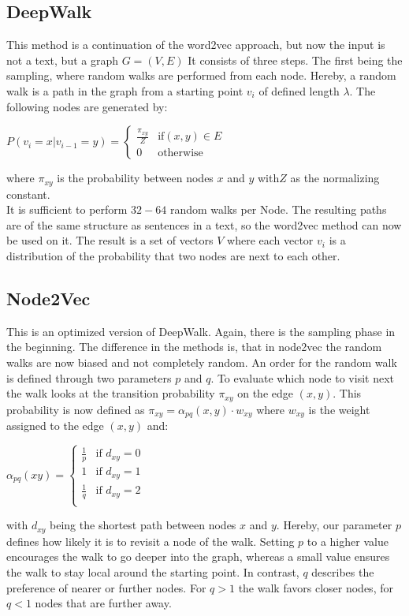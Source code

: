 \documentclass[sigconf]{acmart}
\begin{document}
\subsection{DeepWalk}
This method is a continuation of the word2vec approach, but now the input is not a text, but a graph \(G = (V,E)\)
It consists of three steps. The first being the sampling, where random walks are performed from each node.
Hereby, a random walk is a path in the graph from a starting point \(v_i\) of defined length \(\lambda\). 
The following nodes are generated by: 
\begin{center}
  \(P(v_i = x|v_{i-1} = y) = \begin{cases} \frac{\pi_{xy}}{Z} &\text{if} (x,y) \in E \\ 0 & \text{otherwise} \end{cases}\)
\end{center} 
where \(\pi_{xy}\) is the probability between nodes \(x\) and \(y\) with\(Z\) as the normalizing constant.\\
It is sufficient to perform \(32-64\) random walks per Node. The resulting paths are of the same structure as sentences in a text, so 
the word2vec method can now be used on it.
The result is a set of vectors \(V\) where each vector \(v_i\) is a distribution of the probability that two nodes are next to each other.
\cite{Godec.31.12.2018}


\subsection{Node2Vec}
This is an optimized version of DeepWalk.
Again, there is the sampling phase in the beginning. The difference in the methods is, that in node2vec the random walks are now biased and not completely random.
An order for the random walk is defined through two parameters \(p\) and \(q\). To evaluate which node to visit next the walk looks at the transition probability
\(\pi_{xy}\) on the edge \((x,y)\). This probability is now defined as \(\pi_{xy} = \alpha_{pq}(x, y) \cdot w_{xy}\) where \(w_{xy}\) is the weight assigned to the edge \((x,y)\) and:
\begin{center}
 \(\alpha_{pq}(xy) = \begin{cases} \frac{1}{p} & \text{if } d_{xy} = 0 \\ 1 & \text{if } d_{xy} = 1 \\\frac{1}{q} & \text{if } d_{xy} = 2 \\\end{cases}\)
\end{center}
with \(d_{xy}\) being the shortest path between nodes \(x\) and \(y\).
Hereby, our parameter \(p\) defines how likely it is to revisit a node of the walk. Setting \(p\) to a higher value encourages the walk to go deeper into the graph, whereas a small value 
ensures the walk to stay local around the starting point. 
In contrast, \(q\) describes the preference of nearer or further nodes. For \(q>1\) the walk favors closer nodes, for \(q<1\) nodes that are further away.
\cite{Grover.03.07.2016}
\end{document}
